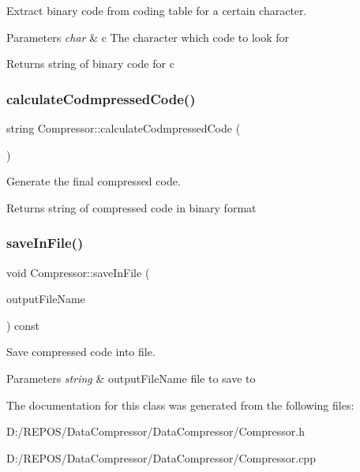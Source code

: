 Extract binary code from coding table for a certain character. 


\begin{DoxyParams}{Parameters}
{\em char} & c The character which code to look for \\
\hline
\end{DoxyParams}
\begin{DoxyReturn}{Returns}
string of binary code for c 
\end{DoxyReturn}
\mbox{\label{class_compressor_a1973489d6ff8cff1458e9eff8dd0e556}} 
\subsubsection{\texorpdfstring{calculateCodmpressedCode()}{calculateCodmpressedCode()}}
{\footnotesize\ttfamily string Compressor\+::calculate\+Codmpressed\+Code (\begin{DoxyParamCaption}{ }\end{DoxyParamCaption})}



Generate the final compressed code. 

\begin{DoxyReturn}{Returns}
string of compressed code in binary format 
\end{DoxyReturn}
\mbox{\label{class_compressor_a462c120db290b92e49a566ada6ba6edf}} 
\subsubsection{\texorpdfstring{saveInFile()}{saveInFile()}}
{\footnotesize\ttfamily void Compressor\+::save\+In\+File (\begin{DoxyParamCaption}\item[{string}]{output\+File\+Name }\end{DoxyParamCaption}) const}



Save compressed code into file. 


\begin{DoxyParams}{Parameters}
{\em string} & output\+File\+Name file to save to \\
\hline
\end{DoxyParams}


The documentation for this class was generated from the following files\+:\begin{DoxyCompactItemize}
\item 
D\+:/\+R\+E\+P\+O\+S/\+Data\+Compressor/\+Data\+Compressor/Compressor.\+h\item 
D\+:/\+R\+E\+P\+O\+S/\+Data\+Compressor/\+Data\+Compressor/Compressor.\+cpp\end{DoxyCompactItemize}

